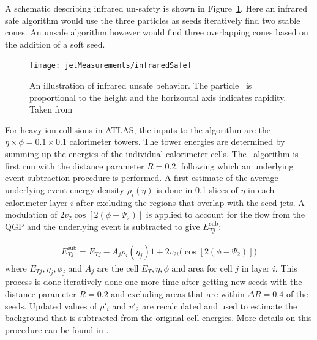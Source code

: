 A schematic describing infrared un-safety is shown in Figure~\ref{fig:infraredSafe}. Here an infrared safe algorithm would use the three particles as seeds iteratively find two stable cones. An unsafe algorithm however would find three overlapping cones based on the addition of a soft seed.

\begin{figure}[htp]
\centering
\texttt{[image: jetMeasurements/infraredSafe]}
\caption{An illustration of infrared unsafe behavior. The particle \pt\ is proportional to the height and the horizontal axis indicates rapidity. Taken from \cite{Salam_2007} }
\label{fig:infraredSafe}
\end{figure}


For heavy ion collisions in ATLAS, the inputs to the algorithm are the $\eta \times \phi = 0.1 \times 0.1$ calorimeter towers. The tower energies are determined by summing up the energies of the individual calorimeter cells. The \antikt\ algorithm is first run with the distance parameter $R=0.2$, following which an underlying event subtraction procedure is performed. A first estimate of the average underlying event energy density $\rho_i (\eta)$ is done in 0.1 slices of $\eta$ in each calorimeter layer $i$ after excluding the regions that overlap with the seed jets. A modulation of $2v_{2} \cos[2(\phi-\Psi_2)] $ is applied to account for the flow from the QGP and the underlying event is subtracted to give $E_{Tj}^{\mathrm{sub}}$:

\begin{align}
E_{Tj}^{\mathrm{sub}} = E_{Tj} - A_j \rho_i (\eta_j) 1+2v_{2i} \big(\cos[2(\phi-\Psi_2)] \big)
\end{align}
where $ E_{Tj} , \eta_j, \phi_j$ and $A_j$ are the cell $E_T, \eta, \phi$ and area for cell $j$ in layer $i$. This process is done iteratively done one more time after getting new seeds with the distance parameter $R = 0.2$ and excluding areas that are within $\Delta R = 0.4$ of the seeds. Updated values of $\rho{'}_i$ and $v{'}_2$ are recalculated and used to estimate the background that is subtracted from the original cell energies. More details on this procedure can be found in \cite{2013220}.



%

